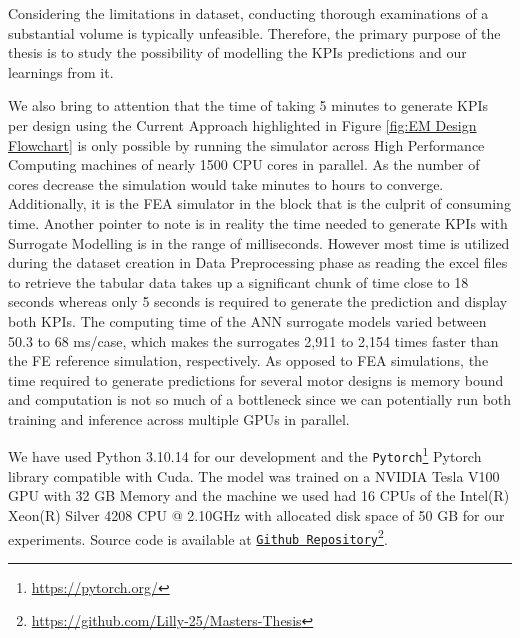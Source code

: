 \documentclass{report} %
\begin{document}
\vspace{1em} %

Considering the limitations in dataset, conducting thorough examinations of a substantial volume is typically unfeasible. 
Therefore, the primary purpose of the thesis is to study the possibility of modelling the \ac{KPI}s predictions and our learnings from it.

We also bring to attention that the time of taking 5 minutes to generate \ac{KPI}s per design using the Current Approach highlighted in Figure 
\ref{fig:EM Design Flowchart} is only possible by running the simulator across High Performance Computing machines of nearly 1500 CPU cores in parallel. 
As the number of cores decrease the simulation would take minutes to hours to converge. Additionally, it is the \ac{FEA} simulator in the block that is the culprit of 
consuming time. Another pointer to note is in reality the time needed to generate \ac{KPI}s with Surrogate Modelling is in the range of milliseconds. 
However most time is utilized during the dataset creation in Data Preprocessing phase as reading the excel files to retrieve the tabular data takes up a 
significant chunk of time close to 18 seconds whereas only 5 seconds is required to generate the prediction and display both \ac{KPI}s.
The computing time of the \ac{ANN} surrogate models varied between 50.3 to 68 ms/case, which makes the surrogates 2,911 to 2,154 times faster than the FE reference simulation, 
respectively. As opposed to \ac{FEA} simulations, the time required to generate predictions for several motor designs is memory bound 
and computation is not so much of a bottleneck since we can potentially run both training and inference across multiple GPUs in parallel.

We have used Python 3.10.14 for our development and the \texttt{Pytorch}\footnote{\url{https://pytorch.org/}} Pytorch library compatible with Cuda.
The model was trained on a NVIDIA Tesla V100 \ac{GPU} with 32 GB Memory and the machine we used had 16 CPUs of the Intel(R) Xeon(R) Silver 4208 CPU @ 2.10GHz 
with allocated disk space of 50 GB for our experiments.
Source code is available at \texttt{\href{https://github.com/Lilly-25/Masters-Thesis}{Github Repository}}\footnote{\url{https://github.com/Lilly-25/Masters-Thesis}}.

\end{document}
